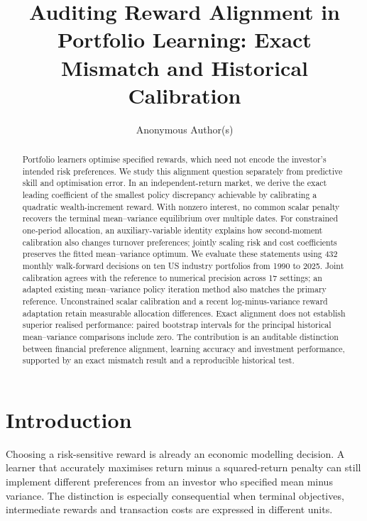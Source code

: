 \documentclass[sigconf,anonymous,review,pbalance]{acmart}
\title{Auditing Reward Alignment in Portfolio Learning: Exact Mismatch and Historical Calibration}
\author{Anonymous Author(s)}
\begin{document}
\begin{abstract}
Portfolio learners optimise specified rewards, which need not encode the investor's intended risk preferences. We study this alignment question separately from predictive skill and optimisation error. In an independent-return market, we derive the exact leading coefficient of the smallest policy discrepancy achievable by calibrating a quadratic wealth-increment reward. With nonzero interest, no common scalar penalty recovers the terminal mean--variance equilibrium over multiple dates. For constrained one-period allocation, an auxiliary-variable identity explains how second-moment calibration also changes turnover preferences; jointly scaling risk and cost coefficients preserves the fitted mean--variance optimum. We evaluate these statements using 432 monthly walk-forward decisions on ten US industry portfolios from 1990 to 2025. Joint calibration agrees with the reference to numerical precision across 17 settings; an adapted existing mean--variance policy iteration method also matches the primary reference. Unconstrained scalar calibration and a recent log-minus-variance reward adaptation retain measurable allocation differences. Exact alignment does not establish superior realised performance: paired bootstrap intervals for the principal historical mean--variance comparisons include zero. The contribution is an auditable distinction between financial preference alignment, learning accuracy and investment performance, supported by an exact mismatch result and a reproducible historical test.
\end{abstract}
\maketitle

\section{Introduction}
Choosing a risk-sensitive reward is already an economic modelling decision. A learner that accurately maximises return minus a squared-return penalty can still implement different preferences from an investor who specified mean minus variance. The distinction is especially consequential when terminal objectives, intermediate rewards and transaction costs are expressed in different units.
\end{document}

